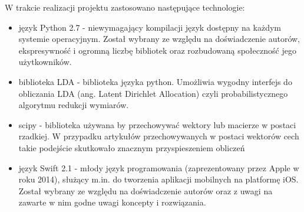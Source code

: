 W trakcie realizacji projektu zastosowano następujące technologie:
\begin{itemize}
  \item język Python 2.7 - niewymagający kompilacji język dostępny na każdym systemie operacyjnym. Został wybrany ze względu na doświadczenie autorów, ekspresywność i ogromną liczbę bibliotek oraz rozbudowaną społeczność jego użytkowników.
 \item biblioteka LDA - biblioteka języka python. Umożliwia wygodny interfejs do obliczania LDA (ang. Latent Dirichlet Allocation) czyli probabilistycznego algorytmu redukcji wymiarów.
 \item scipy - biblioteka używana by przechowywać wektory lub macierze w postaci rzadkiej. W przypadku artykułów przechowywanych w postaci wektorów cech takie podejście skutkowało znacznym przyspieszeniem obliczeń
\item język Swift 2.1 - młody język programowania (zaprezentowany przez Apple w roku 2014), służący m.in. do tworzenia aplikacji mobilnych na platformę iOS. Został wybrany ze względu 
na doświadczenie autorów oraz z uwagi na zawarte 
w nim godne uwagi koncepty i rozwiązania. 
\end{itemize}